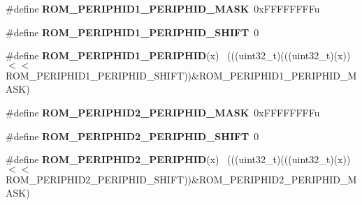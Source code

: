 \begin{DoxyCompactItemize}
\item 
\hypertarget{group___r_o_m___register___masks_ga89bae76549b2b639d154bbab60fa87a6}{}\#define {\bfseries R\+O\+M\+\_\+\+P\+E\+R\+I\+P\+H\+I\+D1\+\_\+\+P\+E\+R\+I\+P\+H\+I\+D\+\_\+\+M\+A\+S\+K}~0x\+F\+F\+F\+F\+F\+F\+F\+Fu\label{group___r_o_m___register___masks_ga89bae76549b2b639d154bbab60fa87a6}

\item 
\hypertarget{group___r_o_m___register___masks_ga9370b3491eef6cf277f1b64339d4cacf}{}\#define {\bfseries R\+O\+M\+\_\+\+P\+E\+R\+I\+P\+H\+I\+D1\+\_\+\+P\+E\+R\+I\+P\+H\+I\+D\+\_\+\+S\+H\+I\+F\+T}~0\label{group___r_o_m___register___masks_ga9370b3491eef6cf277f1b64339d4cacf}

\item 
\hypertarget{group___r_o_m___register___masks_ga48738595ee5946d933007bb0c5ab88c6}{}\#define {\bfseries R\+O\+M\+\_\+\+P\+E\+R\+I\+P\+H\+I\+D1\+\_\+\+P\+E\+R\+I\+P\+H\+I\+D}(x)                            ~(((uint32\+\_\+t)(((uint32\+\_\+t)(x))$<$$<$R\+O\+M\+\_\+\+P\+E\+R\+I\+P\+H\+I\+D1\+\_\+\+P\+E\+R\+I\+P\+H\+I\+D\+\_\+\+S\+H\+I\+F\+T))\&R\+O\+M\+\_\+\+P\+E\+R\+I\+P\+H\+I\+D1\+\_\+\+P\+E\+R\+I\+P\+H\+I\+D\+\_\+\+M\+A\+S\+K)\label{group___r_o_m___register___masks_ga48738595ee5946d933007bb0c5ab88c6}

\item 
\hypertarget{group___r_o_m___register___masks_gac4fd9dca16b12b524b3f7be8cb5d0386}{}\#define {\bfseries R\+O\+M\+\_\+\+P\+E\+R\+I\+P\+H\+I\+D2\+\_\+\+P\+E\+R\+I\+P\+H\+I\+D\+\_\+\+M\+A\+S\+K}~0x\+F\+F\+F\+F\+F\+F\+F\+Fu\label{group___r_o_m___register___masks_gac4fd9dca16b12b524b3f7be8cb5d0386}

\item 
\hypertarget{group___r_o_m___register___masks_ga3a0032b94f8d01378b20d260317d85d9}{}\#define {\bfseries R\+O\+M\+\_\+\+P\+E\+R\+I\+P\+H\+I\+D2\+\_\+\+P\+E\+R\+I\+P\+H\+I\+D\+\_\+\+S\+H\+I\+F\+T}~0\label{group___r_o_m___register___masks_ga3a0032b94f8d01378b20d260317d85d9}

\item 
\hypertarget{group___r_o_m___register___masks_gac9c10e8ddae1e733e5285dbeef4e3b10}{}\#define {\bfseries R\+O\+M\+\_\+\+P\+E\+R\+I\+P\+H\+I\+D2\+\_\+\+P\+E\+R\+I\+P\+H\+I\+D}(x)                            ~(((uint32\+\_\+t)(((uint32\+\_\+t)(x))$<$$<$R\+O\+M\+\_\+\+P\+E\+R\+I\+P\+H\+I\+D2\+\_\+\+P\+E\+R\+I\+P\+H\+I\+D\+\_\+\+S\+H\+I\+F\+T))\&R\+O\+M\+\_\+\+P\+E\+R\+I\+P\+H\+I\+D2\+\_\+\+P\+E\+R\+I\+P\+H\+I\+D\+\_\+\+M\+A\+S\+K)\label{group___r_o_m___register___masks_gac9c10e8ddae1e733e5285dbeef4e3b10}


\end{DoxyCompactItemize}
